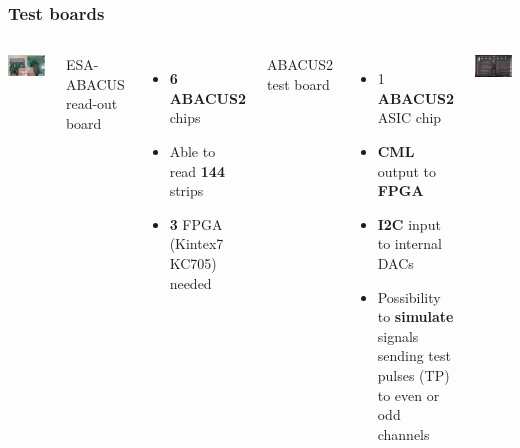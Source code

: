\documentclass[aspectratio=169]{beamer}
\begin{document}
	\begin{frame}
	\frametitle{Test boards}
		\begin{columns}
			\begin{center}
				\includegraphics[width=0.99 \textwidth]{IMG/TestBoard.pdf}
			\end{center}
		{\hspace*{1.5cm}
		{\color{blue}ESA-ABACUS read-out board}
		\begin{itemize}
			\item \textbf{6 ABACUS2} chips
			\item Able to read \textbf{144} strips
			\item \textbf{3} FPGA (Kintex7 KC705) needed
		\end{itemize}
			}
			\vspace*{1cm}
			\hspace*{1.5cm}
			{\color{blue}ABACUS2 test board}
			\begin{itemize}
				\item 1 \textbf{ABACUS2} ASIC chip
				\item \textbf{CML} output to \textbf{FPGA}
				\item \textbf{I2C} input to internal DACs
				\item Possibility to \textbf{simulate} signals sending test pulses (TP) to even or odd channels
			\end{itemize}
		\begin{center}
			\vspace*{0.5cm}
			\includegraphics[width=0.6 \textwidth]{IMG/EsaAbacus.png}
		\end{center}
	
		\end{columns}	
	\end{frame}
\end{document}
